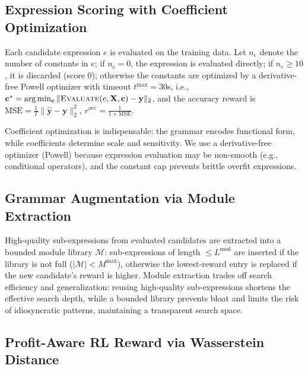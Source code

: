\subsection{Expression Scoring with Coefficient Optimization}
\label{subsec:scoring}

Each candidate expression $e$ is evaluated on the training data. Let $n_c$ denote the number of constants in $e$; if $n_c = 0$, the expression is evaluated directly; if $n_c \geq 10$, it is discarded (score $0$); otherwise the constants are optimized by a derivative-free Powell optimizer with timeout $t^{\max}=30$s, i.e., $\mathbf{c}^{*} = \arg\min_{\mathbf{c}} \| \textsc{Evaluate}(e, \mathbf{X}, \mathbf{c}) - \mathbf{y} \|_{2}$, and the accuracy reward is $\text{MSE} = \frac{1}{T}\|\hat{\mathbf{y}} - \mathbf{y}\|_{2}^{2}$, $r^{\text{acc}} = \frac{1}{1 + \text{MSE}}$.

Coefficient optimization is indispensable: the grammar encodes functional form, while coefficients determine scale and sensitivity. We use a derivative-free optimizer (Powell) because expression evaluation may be non-smooth (e.g., conditional operators), and the constant cap prevents brittle overfit expressions.
\subsection{Grammar Augmentation via Module Extraction}
\label{subsec:augmentation}

High-quality sub-expressions from evaluated candidates are extracted into a bounded module library $\mathcal{M}$: sub-expressions of length $\leq L^{\text{mod}}$ are inserted if the library is not full ($|\mathcal{M}| < M^{\max}$), otherwise the lowest-reward entry is replaced if the new candidate's reward is higher. Module extraction trades off search efficiency and generalization: reusing high-quality sub-expressions shortens the effective search depth, while a bounded library prevents bloat and limits the risk of idiosyncratic patterns, maintaining a transparent search space.

\subsection{Profit-Aware RL Reward via Wasserstein Distance}
\label{subsec:rlreward}

